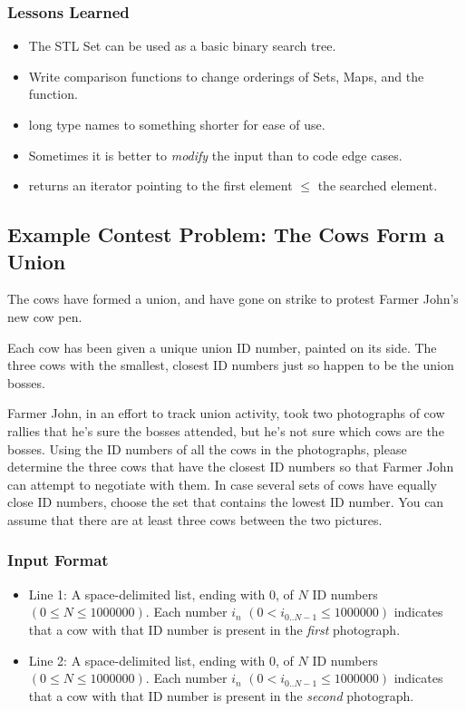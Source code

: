 \subsubsection{Lessons Learned}
\begin{itemize}
	\item The STL Set can be used as a basic binary search tree.
	\item Write comparison functions to change orderings of Sets, Maps, and the  function.
	\item {} long type names to something shorter for ease of use.
	\item Sometimes it is better to \emph{modify} the input than to code edge cases.
	\item {} returns an iterator pointing to the first element $\leq$ the searched element.
\end{itemize}

\subsection{Example Contest Problem: The Cows Form a Union}
The cows have formed a union, and have gone on strike to protest Farmer John's new cow pen.

Each cow has been given a unique union ID number, painted on its side.
The three cows with the smallest, closest ID numbers just so happen to be the union bosses.

Farmer John, in an effort to track union activity, took two photographs of cow rallies that he's sure the bosses attended, but he's not sure which cows are the bosses.
Using the ID numbers of all the cows in the photographs, please determine the three cows that have the closest ID numbers so that Farmer John can attempt to negotiate with them.
In case several sets of cows have equally close ID numbers, choose the set that contains the lowest ID number.
You can assume that there are at least three cows between the two pictures.

\subsubsection{Input Format}
\begin{itemize}
	\item Line 1: A space-delimited list, ending with $0$, of $N$ ID numbers $(0 \leq N \leq 1000000)$. 
		Each number $i_n$ $(0 < i_{0..N-1} \leq 1000000)$ indicates that a cow with that ID number is present in the \emph{first} photograph.
	\item Line 2: A space-delimited list, ending with $0$, of $N$ ID numbers $(0 \leq N \leq 1000000)$. 
		Each number $i_n$ $(0 < i_{0..N-1} \leq 1000000)$ indicates that a cow with that ID number is present in the \emph{second} photograph.
\end{itemize}

